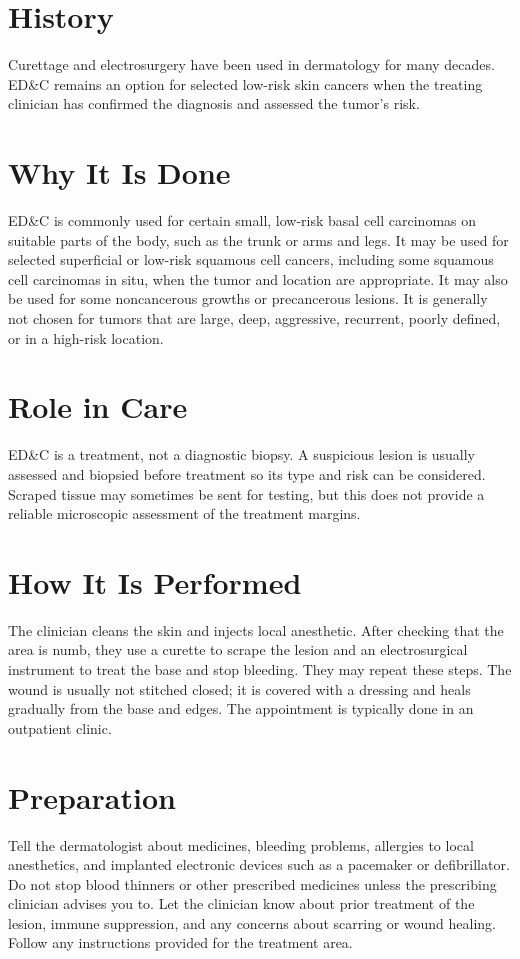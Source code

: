 \section*{History}
Curettage and electrosurgery have been used in dermatology for many decades. ED\&C remains an option for selected low-risk skin cancers when the treating clinician has confirmed the diagnosis and assessed the tumor's risk.

\section*{Why It Is Done}
ED\&C is commonly used for certain small, low-risk basal cell carcinomas on suitable parts of the body, such as the trunk or arms and legs. It may be used for selected superficial or low-risk squamous cell cancers, including some squamous cell carcinomas in situ, when the tumor and location are appropriate. It may also be used for some noncancerous growths or precancerous lesions. It is generally not chosen for tumors that are large, deep, aggressive, recurrent, poorly defined, or in a high-risk location.

\section*{Role in Care}
ED\&C is a treatment, not a diagnostic biopsy. A suspicious lesion is usually assessed and biopsied before treatment so its type and risk can be considered. Scraped tissue may sometimes be sent for testing, but this does not provide a reliable microscopic assessment of the treatment margins.

\section*{How It Is Performed}
The clinician cleans the skin and injects local anesthetic. After checking that the area is numb, they use a curette to scrape the lesion and an electrosurgical instrument to treat the base and stop bleeding. They may repeat these steps. The wound is usually not stitched closed; it is covered with a dressing and heals gradually from the base and edges. The appointment is typically done in an outpatient clinic.

\section*{Preparation}
Tell the dermatologist about medicines, bleeding problems, allergies to local anesthetics, and implanted electronic devices such as a pacemaker or defibrillator. Do not stop blood thinners or other prescribed medicines unless the prescribing clinician advises you to. Let the clinician know about prior treatment of the lesion, immune suppression, and any concerns about scarring or wound healing. Follow any instructions provided for the treatment area.

